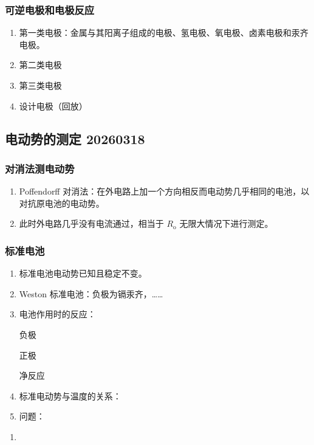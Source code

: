 \subsubsection{可逆电极和电极反应}

\begin{enumerate}
    \item 第一类电极：金属与其阳离子组成的电极、氢电极、氧电极、卤素电极和汞齐电极。
    \item 第二类电极
    \item 第三类电极
    \item 设计电极（回放）
\end{enumerate}

\subsection{电动势的测定 20260318}

\subsubsection{对消法测电动势}

\begin{enumerate}
    \item Poffendorff 对消法：在外电路上加一个方向相反而电动势几乎相同的电池，以对抗原电池的电动势。
    \item 此时外电路几乎没有电流通过，相当于 $R_{\mathrm{o}}$ 无限大情况下进行测定。
\end{enumerate}

\subsubsection{标准电池}

\begin{enumerate}
    \item 标准电池电动势已知且稳定不变。
    \item Weston 标准电池：负极为镉汞齐，……
    \item 电池作用时的反应：
    
    负极

    正极

    净反应
    
    \item 标准电动势与温度的关系：
    \item 问题：
\end{enumerate}

\begin{enumerate}
    \item 
\end{enumerate}

